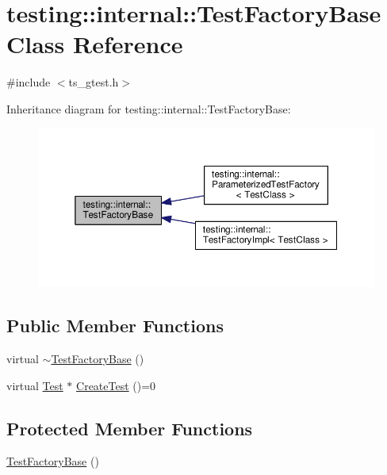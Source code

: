 \hypertarget{classtesting_1_1internal_1_1TestFactoryBase}{\section{testing\-:\-:internal\-:\-:Test\-Factory\-Base Class Reference}
\label{classtesting_1_1internal_1_1TestFactoryBase}
}


{\ttfamily \#include $<$ts\-\_\-gtest.\-h$>$}



Inheritance diagram for testing\-:\-:internal\-:\-:Test\-Factory\-Base\-:\nopagebreak
\begin{figure}[H]
\begin{center}
\leavevmode
\includegraphics[width=350pt]{classtesting_1_1internal_1_1TestFactoryBase__inherit__graph}
\end{center}
\end{figure}
\subsection*{Public Member Functions}
\begin{DoxyCompactItemize}
\item 
virtual \hyperlink{classtesting_1_1internal_1_1TestFactoryBase_a18f22a7594336a36642289c1decddc9e}{$\sim$\-Test\-Factory\-Base} ()
\item 
virtual \hyperlink{classtesting_1_1Test}{Test} $\ast$ \hyperlink{classtesting_1_1internal_1_1TestFactoryBase_a07ac3ca0b196cdb092da0bb186b7c030}{Create\-Test} ()=0
\end{DoxyCompactItemize}
\subsection*{Protected Member Functions}
\begin{DoxyCompactItemize}
\item 
\hyperlink{classtesting_1_1internal_1_1TestFactoryBase_afedbf147b2a213517b315880d8c81427}{Test\-Factory\-Base} ()
\end{DoxyCompactItemize}


